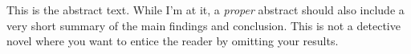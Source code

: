 This is the abstract text. While I'm at it, a \textit{proper} abstract should
also include a very short summary of the main findings and conclusion. This is
not a detective novel where you want to entice the reader by omitting your
results.
